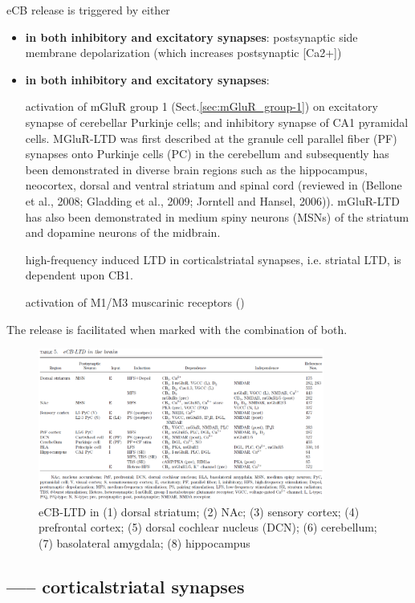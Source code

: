 eCB release is triggered by either 
\begin{itemize}

  \item {\bf in both inhibitory and excitatory synapses}: postsynaptic side
  membrane depolarization (which increases postsynaptic [Ca2+])
  
  \item {\bf in both inhibitory and excitatory synapses}: 
  
  activation of mGluR group 1 (Sect.\ref{sec:mGluR_group-1}) 
  on excitatory synapse of cerebellar Purkinje cells;
  and inhibitory synapse of CA1 pyramidal cells.
  MGluR-LTD was first described at the granule cell parallel fiber (PF) synapses
  onto Purkinje cells (PC) in the cerebellum and subsequently has been
  demonstrated in diverse brain regions such as the hippocampus, neocortex,
  dorsal and ventral striatum and spinal cord   (reviewed in (Bellone et al.,
  2008; Gladding et al., 2009; Jorntell and Hansel, 2006)). 
  mGluR-LTD has also been demonstrated in medium spiny neurons (MSNs) of the
  striatum and dopamine neurons of the midbrain.
  
  high-frequency induced LTD in corticalstriatal synapses, i.e. striatal LTD, is
  dependent upon CB1. 
  
  activation of  M1/M3 muscarinic receptors ()

\end{itemize}
The release is facilitated when marked with the combination of both.

\begin{figure}[hbt]
  \centerline{\includegraphics[height=5cm,
    angle=0]{./images/eCB-LTD.eps}}
\caption{eCB-LTD in (1) dorsal striatum; (2) NAc; (3) sensory cortex; (4)
prefrontal cortex; (5) dorsal cochlear nucleus (DCN); (6) cerebellum; (7)
basolateral amygdala; (8) hippocampus}
\label{fig:eCB-LTD}
\end{figure}

\subsection{----- corticalstriatal synapses}



